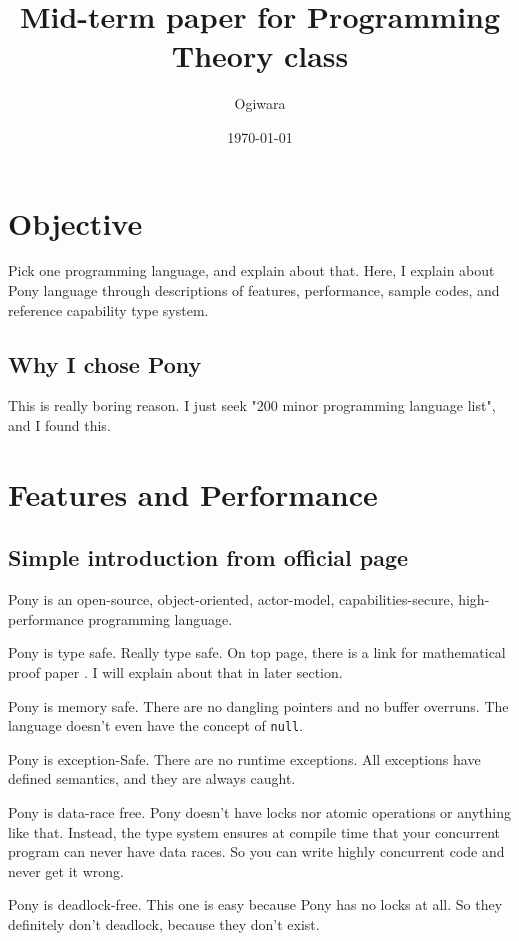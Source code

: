 \documentclass{article}
\title{Mid-term paper for Programming Theory class}
\author{Ogiwara}
\date{\today}
\begin{document}
\begin{multicols}{2}
[
\maketitle
]
\section{Objective}
Pick one programming language, and explain about that.
Here, I explain about Pony language \cite{ponylang} through descriptions of features, performance, sample codes, and reference capability type system.

\subsection{Why I chose Pony}
This is really boring reason. I just seek "200 minor programming language list"\cite{200}, and I found this.  

\section{Features and Performance}

\subsection{Simple introduction from official page \cite{ponylang}}
Pony is an open-source, object-oriented, actor-model, capabilities-secure, high-performance programming language. 

Pony is type safe. Really type safe. On top page, there is a link for mathematical proof paper \cite{type-proof-paper}. I will explain about that in later section.

Pony is memory safe. There are no dangling pointers and no buffer overruns. The language doesn't even have the concept of \texttt{null}. 

Pony is exception-Safe. There are no runtime exceptions. All exceptions have defined semantics, and they are always caught. 

Pony is data-race free. Pony doesn't have locks nor atomic operations or anything like that. Instead, the type system ensures at compile time that your concurrent program can never have data races. So you can write highly concurrent code and never get it wrong. 

Pony is deadlock-free. This one is easy because Pony has no locks at all. So they definitely don’t deadlock, because they don't exist.


\end{multicols}
\end{document}
